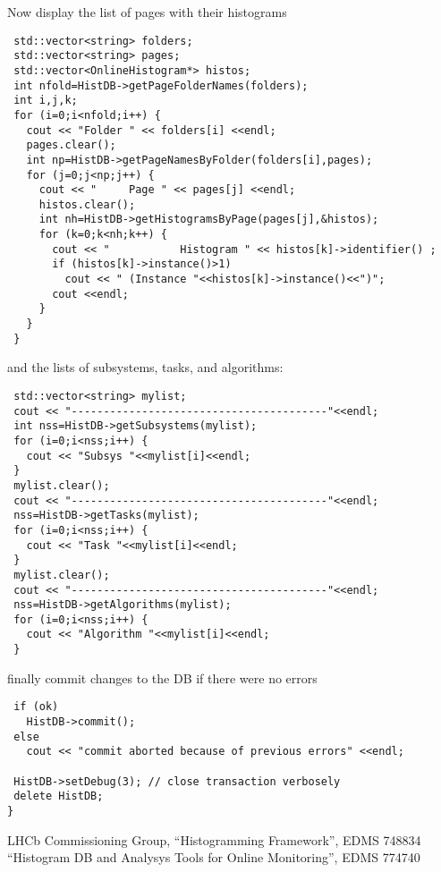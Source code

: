 \documentclass{lhcbnote}
\begin{document}
Now display the list of pages with their histograms
\begin{verbatim}
 std::vector<string> folders;
 std::vector<string> pages;
 std::vector<OnlineHistogram*> histos;  
 int nfold=HistDB->getPageFolderNames(folders);
 int i,j,k;
 for (i=0;i<nfold;i++) {
   cout << "Folder " << folders[i] <<endl;
   pages.clear();
   int np=HistDB->getPageNamesByFolder(folders[i],pages);
   for (j=0;j<np;j++) {
     cout << "     Page " << pages[j] <<endl;
     histos.clear();
     int nh=HistDB->getHistogramsByPage(pages[j],&histos);
     for (k=0;k<nh;k++) {
       cout << "           Histogram " << histos[k]->identifier() ;
       if (histos[k]->instance()>1)
         cout << " (Instance "<<histos[k]->instance()<<")";
       cout <<endl;
     }    
   }
 }
\end{verbatim}
and the lists of subsystems, tasks, and algorithms:
\begin{verbatim}
 std::vector<string> mylist;
 cout << "----------------------------------------"<<endl;
 int nss=HistDB->getSubsystems(mylist);
 for (i=0;i<nss;i++) {
   cout << "Subsys "<<mylist[i]<<endl;
 }
 mylist.clear();
 cout << "----------------------------------------"<<endl;
 nss=HistDB->getTasks(mylist);
 for (i=0;i<nss;i++) {
   cout << "Task "<<mylist[i]<<endl;
 }
 mylist.clear();
 cout << "----------------------------------------"<<endl;
 nss=HistDB->getAlgorithms(mylist);
 for (i=0;i<nss;i++) {
   cout << "Algorithm "<<mylist[i]<<endl;
 }
\end{verbatim}

finally commit changes to the DB if there were no errors
\begin{verbatim}
 if (ok) 
   HistDB->commit();
 else 
   cout << "commit aborted because of previous errors" <<endl;

 HistDB->setDebug(3); // close transaction verbosely
 delete HistDB;
}
\end{verbatim}


\begin{thebibliography}{99}
LHCb Commissioning Group, ``Histogramming Framework'', EDMS 748834
``Histogram DB and Analysys Tools for Online Monitoring'', EDMS 774740

\end{thebibliography}
\end{document}
